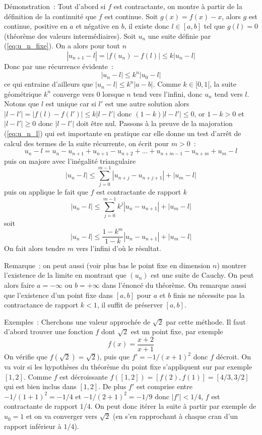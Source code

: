 \documentclass[a4paper,11pt]{article}
\begin{document}
\begin{giacjshere}
Démonstration~: Tout d'abord si $f$ est contractante, on montre à partir
de la définition de la continuité que $f$ est continue. 
Soit $g(x)=f(x)-x$, alors $g$ est continue, positive en $a$ et négative
en $b$, il existe donc $l\in[a,b]$ tel que $g(l)=0$ (théorème des
valeurs intermédiaires). 
Soit $u_n$ une suite définie par
(\ref{eq:u_n_fixe}). On a alors pour tout $n$
\[ |u_{n+1}-l|=|f(u_n)-f(l)| \leq k |u_n-l| \]
Donc par une récurrence évidente~:
\[ |u_n-l| \leq k^n |u_0-l| \]
ce qui entraine d'ailleurs que $|u_n-l| \leq k^n |a-b|$.
Comme $k \in [0,1[ $, la suite géométrique $k^n$ converge vers 0
lorsque $n$ tend vers l'infini, donc $u_n$ tend vers $l$.
Notons que $l$ est unique car si $l'$ est une autre solution
alors $|l-l'|=|f(l)-f(l')| \leq k|l-l'|$ donc $(1-k)|l-l'| \leq 0$,
or $1-k>0$ et $|l-l'| \geq 0$ donc $|l-l'|$ doit \^etre nul.
Passons à la preuve de la majoration (\ref{eq:u_n_l}) qui est importante
en pratique car elle donne un test d'arrêt de calcul des
termes de la suite récurrente, on écrit pour $m>0$~:
\[ u_n-l= u_n - u_{n+1} + u_{n+1} - u_{n+2} + ... + u_{n+m-1}- u_{n+m}
+ u_m-l \]
puis on majore avec l'inégalité triangulaire
\[ |u_n-l| \leq \sum_{j=0}^{m-1} |u_{n+j}-u_{n+j+1}| + |u_m-l| \]
puis on applique le fait que $f$ est contractante de rapport $k$
\[ |u_n-l| \leq \sum_{j=0}^{m-1} k^j |u_{n}-u_{n+1}| + |u_m-l| \]
soit
\[ |u_n-l| \leq \frac{1-k^m}{1-k} |u_{n}-u_{n+1}| + |u_m-l| \]
On fait alors tendre $m$ vers l'infini d'où le résultat.

Remarque~: on peut aussi (voir plus bas le point fixe en dimension
$n$) montrer l'existence de la limite en montrant que $(u_n)$ est
une suite de Cauchy. On peut alors faire $a=-\infty$ ou $b=+\infty$
dans l'\'enonc\'e du th\'eor\`eme. On remarque aussi 
que l'existence d'un point fixe
dans $[a,b]$ pour $a$ et $b$ finis ne n\'ecessite pas la contractance
de rapport $k<1$, il suffit de pr\'eserver $[a,b]$.

Exemples~: 
Cherchons une valeur approchée de $\sqrt{2}$ par cette méthode.
Il faut d'abord trouver une fonction $f$ dont $\sqrt{2}$ est un point
fixe, par exemple
\[ f(x)=\frac{x+2}{x+1}\]
On vérifie que $f(\sqrt{2})=\sqrt{2})$, puis que $f'=-1/(x+1)^2$
donc $f$ décroit. On va voir si les hypothèses du théorème du point
fixe s'appliquent sur par exemple $[1,2]$. Comme $f$ est décroissante
$f([1,2])=[f(2),f(1)]=[4/3,3/2]$ qui est bien inclus dans $[1,2] $.
De plus $f'$ est comprise entre $-1/(1+1)^2=-1/4$ et $-1/(2+1)^2=-1/9$ donc
$|f'|<1/4$, $f$ est contractante de rapport $1/4$. On peut donc
itérer la suite à partir par exemple de $u_0=1$ et on va converger
vers $\sqrt{2}$ (en s'en rapprochant à chaque cran d'un rapport
inférieur à $1/4$).


\end{giacjshere}
\end{document}
